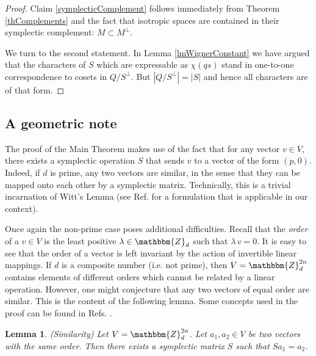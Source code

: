 \documentclass[aps,twocolumn,floatfix]{revtex4}
\newtheorem{lemma}[theorem]{Lemma}
\def\ZZ{\mathbbm{Z}}
\begin{document}
\begin{proof}
	Claim \ref{symplecticComplement} follows immediately from Theorem
	\ref{thComplements} and the fact that isotropic spaces are contained
	in their symplectic complement: $M\subset M^\bot$.

	We turn to the second statement. In Lemma \ref{lmWignerConstant} we
	have argued that the characters of $S$ which are expressable as
	$\chi(qs)$ stand in one-to-one correspondence to cosets in
	$Q/S^\bot$. But $|Q/S^\bot|=|S|$ and hence all characters are of
	that form.  \end{proof}


\subsection{A geometric note}
\label{scGeometric}

The proof of the Main Theorem makes use of the fact that for any
vector $v \in V$, there exists a symplectic operation $S$ that sends
$v$ to a vector of the form $(p,0)$.  Indeed, if $d$ is prime, any two
vectors are similar, in the sense that they can be mapped onto each
other by a symplectic matrix. Technically, this is a trivial
incarnation of Witt's Lemma (see Ref.  \cite{aschbacher} for a
formulation that is applicable in our context). 

Once again the non-prime case poses additional difficulties.  Recall
that the \emph{order} of a $v\in V$ is the least positive $\lambda \in
\ZZ_d$ such that $\lambda\,v=0$. It is easy to see that the order of a
vector is left invariant by the action of invertible linear mappings.
If $d$ is a composite number (i.e. not prime), then $V=\ZZ_d^{2n}$
contains elements of different orders which cannot be related by a
linear operation. However, one might conjecture that any two vectors of
equal order are similar. This is the content of the following lemma.
Some concepts used in the proof can be found in Refs.
\cite{huppert,zmud}.

\begin{lemma} \emph{(Similarity)}
	Let $V=\ZZ_d^{2n}$. Let $a_1, a_2 \in V$ be two vectors with the same
	order. Then there exists a symplectic matrix $S$ such that
	$S a_1=a_2$.
\end{lemma}
\end{document}
